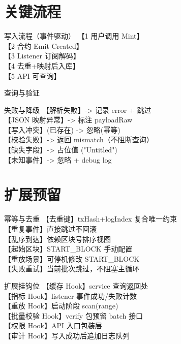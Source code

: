 \documentclass[10pt]{beamer}
\begin{document}
\section{关键流程}
\begin{frame}{写入流程（事件驱动）}
  【1 用户调用 Mint】\\
  【2 合约 Emit Created】\\
  【3 Listener 订阅解码】\\
  【4 去重+映射后入库】\\
  【5 API 可查询】\\
\end{frame}
\begin{frame}{查询与验证}
\end{frame}
\begin{frame}{失败与降级}
  【解析失败】-> 记录 error + 跳过\\
  【JSON 映射异常】-> 标注 payloadRaw\\
  【写入冲突】(已存在) -> 忽略(幂等)\\
  【校验失败】-> 返回 mismatch（不阻断查询）\\
  【缺失字段】-> 占位值 ("Untitled")\\
  【未知事件】-> 忽略 + debug log
\end{frame}

\section{扩展预留}
\begin{frame}{幂等与去重}
  【去重键】txHash+logIndex 复合唯一约束\\
  【重复事件】直接跳过不回滚\\
  【乱序到达】依赖区块号排序视图\\
  【起始区块】START\_BLOCK 手动配置\\
  【重放场景】可停机修改 START\_BLOCK\\
  【失败重试】当前批次跳过，不阻塞主循环
\end{frame}
\begin{frame}{扩展挂钩位}
  【缓存 Hook】service 查询返回处\\
  【指标 Hook】listener 事件成功/失败计数\\
  【重放 Hook】启动阶段 scan(range)\\
  【批量校验 Hook】verify 包预留 batch 接口\\
  【权限 Hook】API 入口包装层\\
  【审计 Hook】写入成功后追加日志队列
\end{frame}
\end{document}
